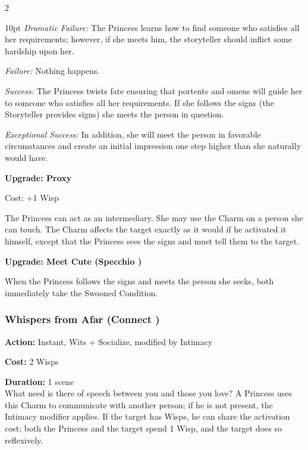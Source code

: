 \begin{multicols}{2}
\begin{myindentpar}{10pt}
    \emph{Dramatic Failure:} The Princess learns how to find someone who satisfies all her requirements; however, if she meets him, the storyteller should inflict some hardship upon her.
    
    \emph{Failure:} Nothing happens. 
    
    \emph{Success:} The Princess twists fate ensuring that portents and omens will guide her to someone who satisfies all her requirements. If she follows the signs (the Storyteller provides signs) she meets the person in question.
    
    \emph{Exceptional Success:} In addition, she will meet the person in favorable circumstances and create an initial impression one step higher than she naturally would have.
    
    \textbf{Upgrade: Proxy}
    
    Cost: +1 Wisp 
    
    The Princess can act as an intermediary. She may use the Charm on a person she can touch. The Charm affects the target exactly as it would if he activated it himself, except that the Princess sees the signs and must tell them to the target.    
	
	\textbf{Upgrade: Meet Cute (Specchio \textbullet\textbullet\textbullet)}
	
	When the Princess follows the signs and meets the person she seeks, both immediately take the Swooned Condition. 
	
\end{myindentpar}

\subsubsection*{Whispers from Afar (Connect \textbullet\textbullet\textbullet)}

\noindent \textbf{Action:} Instant, Wits + Socialize, modified by Intimacy

\noindent \textbf{Cost:} 2 Wisps

\noindent \textbf{Duration:} 1 scene \\

\noindent What need is there of speech between you and those you love? A Princess uses this Charm to communicate with another person; if he is not present, the Intimacy modifier applies. If the target has Wisps, he can share the activation cost; both the Princess and the target spend 1 Wisp, and the target does so reflexively. \\



\end{multicols}

